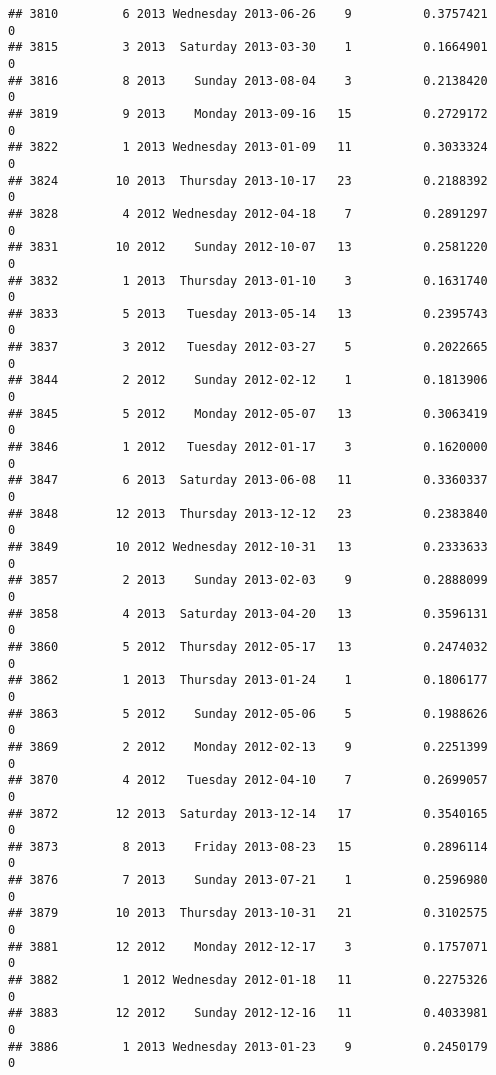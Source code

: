 \documentclass[
]{article}
\begin{document}
\begin{verbatim}
## 3810         6 2013 Wednesday 2013-06-26    9          0.3757421             0
## 3815         3 2013  Saturday 2013-03-30    1          0.1664901             0
## 3816         8 2013    Sunday 2013-08-04    3          0.2138420             0
## 3819         9 2013    Monday 2013-09-16   15          0.2729172             0
## 3822         1 2013 Wednesday 2013-01-09   11          0.3033324             0
## 3824        10 2013  Thursday 2013-10-17   23          0.2188392             0
## 3828         4 2012 Wednesday 2012-04-18    7          0.2891297             0
## 3831        10 2012    Sunday 2012-10-07   13          0.2581220             0
## 3832         1 2013  Thursday 2013-01-10    3          0.1631740             0
## 3833         5 2013   Tuesday 2013-05-14   13          0.2395743             0
## 3837         3 2012   Tuesday 2012-03-27    5          0.2022665             0
## 3844         2 2012    Sunday 2012-02-12    1          0.1813906             0
## 3845         5 2012    Monday 2012-05-07   13          0.3063419             0
## 3846         1 2012   Tuesday 2012-01-17    3          0.1620000             0
## 3847         6 2013  Saturday 2013-06-08   11          0.3360337             0
## 3848        12 2013  Thursday 2013-12-12   23          0.2383840             0
## 3849        10 2012 Wednesday 2012-10-31   13          0.2333633             0
## 3857         2 2013    Sunday 2013-02-03    9          0.2888099             0
## 3858         4 2013  Saturday 2013-04-20   13          0.3596131             0
## 3860         5 2012  Thursday 2012-05-17   13          0.2474032             0
## 3862         1 2013  Thursday 2013-01-24    1          0.1806177             0
## 3863         5 2012    Sunday 2012-05-06    5          0.1988626             0
## 3869         2 2012    Monday 2012-02-13    9          0.2251399             0
## 3870         4 2012   Tuesday 2012-04-10    7          0.2699057             0
## 3872        12 2013  Saturday 2013-12-14   17          0.3540165             0
## 3873         8 2013    Friday 2013-08-23   15          0.2896114             0
## 3876         7 2013    Sunday 2013-07-21    1          0.2596980             0
## 3879        10 2013  Thursday 2013-10-31   21          0.3102575             0
## 3881        12 2012    Monday 2012-12-17    3          0.1757071             0
## 3882         1 2012 Wednesday 2012-01-18   11          0.2275326             0
## 3883        12 2012    Sunday 2012-12-16   11          0.4033981             0
## 3886         1 2013 Wednesday 2013-01-23    9          0.2450179             0

\end{verbatim}
\end{document}
